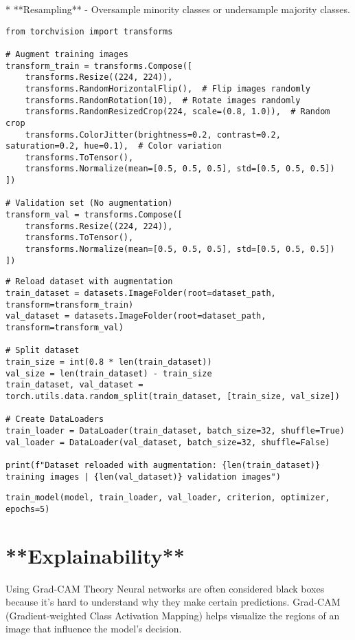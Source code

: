 *  **Resampling** - Oversample minority classes or undersample majority classes.

\begin{verbatim}
from torchvision import transforms

# Augment training images
transform_train = transforms.Compose([
    transforms.Resize((224, 224)),
    transforms.RandomHorizontalFlip(),  # Flip images randomly
    transforms.RandomRotation(10),  # Rotate images randomly
    transforms.RandomResizedCrop(224, scale=(0.8, 1.0)),  # Random crop
    transforms.ColorJitter(brightness=0.2, contrast=0.2, saturation=0.2, hue=0.1),  # Color variation
    transforms.ToTensor(),
    transforms.Normalize(mean=[0.5, 0.5, 0.5], std=[0.5, 0.5, 0.5])
])

# Validation set (No augmentation)
transform_val = transforms.Compose([
    transforms.Resize((224, 224)),
    transforms.ToTensor(),
    transforms.Normalize(mean=[0.5, 0.5, 0.5], std=[0.5, 0.5, 0.5])
])
\end{verbatim}

\begin{verbatim}
# Reload dataset with augmentation
train_dataset = datasets.ImageFolder(root=dataset_path, transform=transform_train)
val_dataset = datasets.ImageFolder(root=dataset_path, transform=transform_val)

# Split dataset
train_size = int(0.8 * len(train_dataset))
val_size = len(train_dataset) - train_size
train_dataset, val_dataset = torch.utils.data.random_split(train_dataset, [train_size, val_size])

# Create DataLoaders
train_loader = DataLoader(train_dataset, batch_size=32, shuffle=True)
val_loader = DataLoader(val_dataset, batch_size=32, shuffle=False)

print(f"Dataset reloaded with augmentation: {len(train_dataset)} training images | {len(val_dataset)} validation images")

\end{verbatim}

\begin{verbatim}
train_model(model, train_loader, val_loader, criterion, optimizer, epochs=5)

\end{verbatim}

\section{**Explainability**}

 Using Grad-CAM Theory Neural networks are often considered black boxes because it's hard to understand why they make certain predictions. Grad-CAM (Gradient-weighted Class Activation Mapping) helps visualize the regions of an image that influence the model’s decision.

